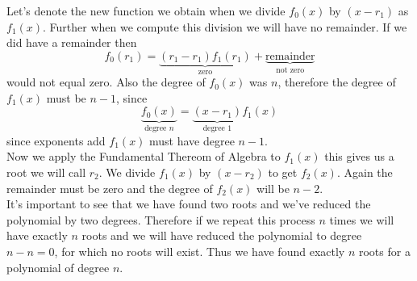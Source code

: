 \documentclass[12pt]{article}
\begin{document}
Let's denote the new function we obtain when we divide $f_0(x)$ by $(x-r_1)$ as $f_1(x)$.  Further when we compute this division we will have no remainder.  If we did have a remainder then 
$$f_0(r_1)= \underbrace{(r_1-r_1) f_1(r_1)}_{\text{zero}} + \underbrace{\text{remainder}}_{\text{not zero}}$$
would not equal zero.  Also the degree of $f_0(x)$ was $n$, therefore the degree of  $f_1(x)$ must be $n-1$, since 
$$ \underbrace{f_0(x)}_{\text{degree } n}= \underbrace{(x-r_1)}_{\text{degree }1} f_1(x)$$
since exponents add $f_1(x)$ must have degree $n-1$.\\

Now we apply the Fundamental Thereom of Algebra to $f_1(x)$ this gives us a root we will call $r_2$.  We divide $f_1(x)$ by $(x-r_2)$ to get $f_2(x)$.  Again the remainder must be zero and the degree of $f_2(x)$ will be $n-2$.\\

It's important to see that we have found two roots and we've reduced the polynomial by two degrees.  Therefore if we repeat this process $n$ times we will have exactly $n$ roots and we will have reduced the polynomial to degree $n-n=0$, for which no roots will exist.  Thus we have found exactly $n$ roots for a polynomial of degree $n$.








\end{document}
